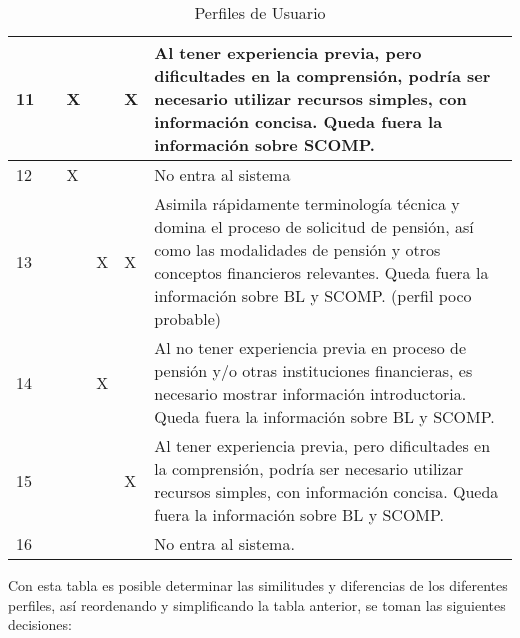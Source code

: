 \begin{table}
\begin{tabular}{|p{1cm}|p{1cm}|p{1.5cm}|p{1.5cm}|p{1.5cm}|p{6cm}|}
         11& & X & & X & Al tener experiencia previa, pero dificultades en la comprensión, podría ser necesario utilizar recursos simples, con información concisa. Queda fuera la información sobre SCOMP. \\
         \hline
         12& & X & & & No entra al sistema \\ 
         \hline
         13 & & & X& X & Asimila rápidamente terminología técnica y domina el proceso de solicitud de pensión, así como las modalidades de pensión y otros conceptos financieros relevantes. Queda fuera la información sobre BL y SCOMP. (perfil poco probable)\\
         \hline
         14 & & &X& & Al no tener experiencia previa en proceso de pensión y/o otras instituciones financieras, es necesario mostrar información introductoria. Queda fuera la información sobre BL y SCOMP.\\
         \hline
         15 & & & & X& Al tener experiencia previa, pero dificultades en la comprensión, podría ser necesario utilizar recursos simples, con información concisa. Queda fuera la información sobre BL y SCOMP.\\
         \hline
         16 & & & & & No entra al sistema.\\
         \hline
    \end{tabular}
    \caption{Perfiles de Usuario}
    \label{tab:perfiles}
\end{table}

Con esta tabla es posible determinar las similitudes y diferencias de los diferentes perfiles, así reordenando y simplificando la tabla anterior, se toman las siguientes decisiones: 

